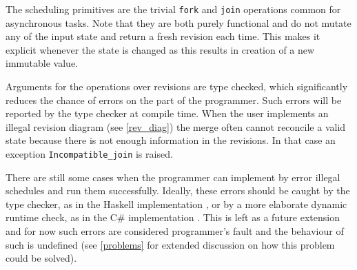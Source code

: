 \documentclass[12pt,twoside,notitlepage]{report}
\begin{document}
The scheduling primitives are the trivial {\tt fork} and {\tt join} operations common for asynchronous tasks. Note that they are both purely functional and do not mutate any of the input state and return a fresh revision each time. This makes it explicit whenever the state is changed as this results in creation of a new immutable value. 


Arguments for the operations over revisions are type checked, which significantly reduces the chance of errors on the part of the programmer. Such errors will be reported by the type checker at compile time. When the user implements an illegal revision diagram (see \ref{rev_diag}) the merge often cannot reconcile a valid state because there is not enough information in the revisions. In that case an exception {\tt Incompatible\_join} is raised. 

There are still some cases when the programmer can implement by error illegal schedules and run them successfully. Ideally, these errors should be caught by the type checker, as in the Haskell implementation \cite{haskell}, or by a more elaborate dynamic runtime check, as in the C\# implementation \cite{conrev}.
This is left as a future extension and for now such errors are considered programmer's fault and the behaviour of such is undefined (see \ref{problems} for extended discussion on how this problem could be solved).   
\end{document}
